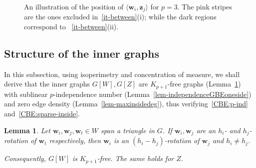 \documentclass[11pt, a4paper]{article}
\newcommand\innerp[1]{\langle #1 \rangle}
\newcommand{\V}[1]{\mathbold{#1}}
\newtheorem{lemma}[theorem]{Lemma}
\theoremstyle{definition}
\begin{document}
\begin{figure}[h]
{
}
		\caption{An illustration of the position of $\innerp{\V{w}_i,\V{z}_j}$ for $p=3$. The pink stripes are the ones excluded in~\ref{it-between}(i); while the dark regions correspond to ~\ref{it-between}(ii).\label{fig:GBE}}
\end{figure}





\subsection{Structure of the inner graphs}
In this subsection, using isoperimetry and concentration of measure, we shall derive that the inner graphs $G[W], G[Z]$ are $K_{p+1}$-free graphs (Lemma~\ref{obs-samerotation}) with sublinear $p$-independence number (Lemma~\ref{lem-independenceGBEoneside}) and zero edge density (Lemma~\ref{lem-maxinsidedeg}), thus verifying~\ref{CBE:p-ind} and~\ref{CBE:sparse-inside}.


\begin{lemma}\label{obs-samerotation}
	Let $\V{w}_i,\V{w}_{j},\V{w}_{t}\in W$ span a triangle in $G$. If $\V{w}_i, \V{w}_{j}$ are an $h_i$- and $h_j$-rotation of $\V{w}_{t}$ respectively, then $\V{w}_i$ is an $(h_i-h_j)$-rotation of $\V{w}_{j}$ and $h_i\neq h_j$. 
	
	Consequently, $G[W]$ is $K_{ p+1}$-free. The same holds for $Z$.
\end{lemma}
\end{document}
